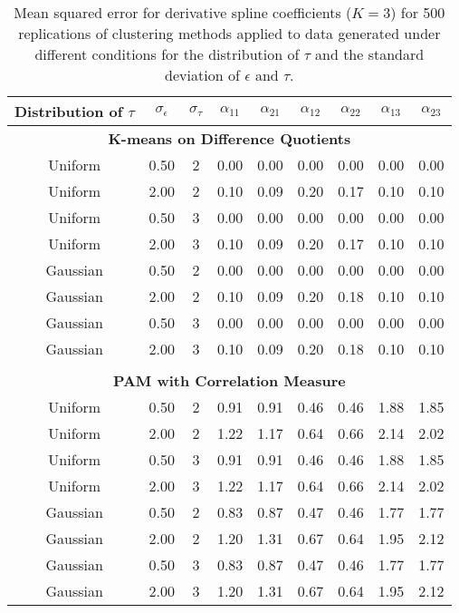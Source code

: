 \begin{table}[ht]
\begin{center}
\begin{tabular}{ccc|cccccc}
  \hline Distribution of $\tau$&$\sigma_{\epsilon}$&$\sigma_{\tau}$&$\alpha_{11}$&$\alpha_{21}$&$\alpha_{12}$&$\alpha_{22}$&$\alpha_{13}$&$\alpha_{23}$\\  \hline\multicolumn{9}{c}{\textbf{K-means on Difference Quotients}}\\ Uniform & 0.50 &   2 & 0.00 & 0.00 & 0.00 & 0.00 & 0.00 & 0.00 \\ 
  Uniform & 2.00 &   2 & 0.10 & 0.09 & 0.20 & 0.17 & 0.10 & 0.10 \\ 
  Uniform & 0.50 &   3 & 0.00 & 0.00 & 0.00 & 0.00 & 0.00 & 0.00 \\ 
  Uniform & 2.00 &   3 & 0.10 & 0.09 & 0.20 & 0.17 & 0.10 & 0.10 \\ 
  Gaussian & 0.50 &   2 & 0.00 & 0.00 & 0.00 & 0.00 & 0.00 & 0.00 \\ 
  Gaussian & 2.00 &   2 & 0.10 & 0.09 & 0.20 & 0.18 & 0.10 & 0.10 \\ 
  Gaussian & 0.50 &   3 & 0.00 & 0.00 & 0.00 & 0.00 & 0.00 & 0.00 \\ 
  Gaussian & 2.00 &   3 & 0.10 & 0.09 & 0.20 & 0.18 & 0.10 & 0.10 \\ 
   \\ \multicolumn{9}{c}{\textbf{PAM with Correlation Measure}}\\Uniform & 0.50 &   2 & 0.91 & 0.91 & 0.46 & 0.46 & 1.88 & 1.85 \\ 
  Uniform & 2.00 &   2 & 1.22 & 1.17 & 0.64 & 0.66 & 2.14 & 2.02 \\ 
  Uniform & 0.50 &   3 & 0.91 & 0.91 & 0.46 & 0.46 & 1.88 & 1.85 \\ 
  Uniform & 2.00 &   3 & 1.22 & 1.17 & 0.64 & 0.66 & 2.14 & 2.02 \\ 
  Gaussian & 0.50 &   2 & 0.83 & 0.87 & 0.47 & 0.46 & 1.77 & 1.77 \\ 
  Gaussian & 2.00 &   2 & 1.20 & 1.31 & 0.67 & 0.64 & 1.95 & 2.12 \\ 
  Gaussian & 0.50 &   3 & 0.83 & 0.87 & 0.47 & 0.46 & 1.77 & 1.77 \\ 
  Gaussian & 2.00 &   3 & 1.20 & 1.31 & 0.67 & 0.64 & 1.95 & 2.12 \\ 
   \hline\end{tabular}
\caption{Mean squared error for derivative spline coefficients ($K=3$) for 500 replications of clustering methods applied to data generated under different conditions for the distribution of $\tau$ and the standard deviation of $\epsilon$ and $\tau$.}
\label{tab:mse2}
\end{center}
\end{table}
